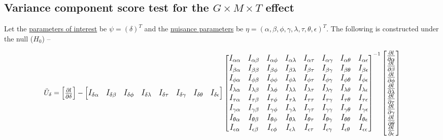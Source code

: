 \documentclass[hidelinks]{article}
\begin{document}
%
\subsection{Variance component score test for the $G \times M \times T$ effect}
%
Let the \underline{parameters of interest} be $\psi = (\delta)^T$ and the \underline{nuisance parameters} be $\eta = (\alpha, \beta, \phi, \gamma, \lambda, \tau, \theta, \epsilon)^T$. The following is constructed under the null ($H_0$) --

\[
\large
\ddot{U}_{\delta} = \begin{bmatrix} \frac{\partial l }{\partial \delta}  \end{bmatrix}
 - \begin{bmatrix} I_{\delta\alpha} & I_{\delta\beta} & I_{\delta\phi}  &   I_{\delta\lambda} &   I_{\delta\tau} & I_{\delta\gamma} & I_{\delta\theta} &I_{\delta\epsilon} \end{bmatrix} 
   \begin{bmatrix} I_{\alpha\alpha} & I_{\alpha\beta} & I_{\alpha\phi} & I_{\alpha\lambda} & I_{\alpha\tau} & I_{\alpha\gamma} & I_{\alpha\theta} & I_{\alpha\epsilon} \\ 
   			 I_{\beta\alpha} & I_{\beta\beta} & I_{\beta\phi} & I_{\beta\lambda} & I_{\beta\tau} &  I_{\beta\gamma} & I_{\beta\theta} & I_{\beta\epsilon} \\ 	
			 I_{\phi\alpha} & I_{\phi\beta} & I_{\phi\phi} & I_{\phi\lambda} & I_{\phi\tau} &  I_{\phi\gamma} & I_{\phi\theta} & I_{\phi\epsilon} \\ 	
			 I_{\lambda\alpha} & I_{\lambda\beta} & I_{\lambda\phi} & I_{\lambda\lambda} & I_{\lambda\tau} &  I_{\lambda\gamma} & I_{\lambda\theta} & I_{\lambda\epsilon} \\ 
			 I_{\tau\alpha} & I_{\tau\beta} & I_{\tau\phi} & I_{\tau\lambda} & I_{\tau\tau} &  I_{\tau\gamma} & I_{\tau\theta} & I_{\tau\epsilon} \\ 	
			 I_{\gamma\alpha} & I_{\gamma\beta} & I_{\gamma\phi} & I_{\gamma\lambda} & I_{\gamma\tau} &  I_{\gamma\gamma} & I_{\gamma\theta} & I_{\gamma\epsilon} \\ 
			 I_{\theta\alpha} & I_{\theta\beta} & I_{\theta\phi} & I_{\theta\lambda} & I_{\theta\tau} &  I_{\theta\gamma} & I_{\theta\theta} & I_{\theta\epsilon} \\ 
			 I_{\epsilon\alpha} & I_{\epsilon\beta} & I_{\epsilon\phi} & I_{\epsilon\lambda} & I_{\epsilon\tau} & I_{\epsilon\gamma} & I_{\epsilon\theta} & I_{\epsilon\epsilon} \end{bmatrix}^{-1} 			 			 
\begin{bmatrix} \frac{\partial l}{\partial \alpha}  \\   \frac{\partial l}{\partial \beta}  \\  \frac{\partial l}{\partial \phi}  \\ \frac{\partial l}{\partial \lambda}  \\ \frac{\partial l}{\partial \tau}  \\    \frac{\partial l}{\partial \gamma}  \\ \frac{\partial l}{\partial \theta}  \\ \frac{\partial l}{\partial \epsilon} \end{bmatrix}
\]
\end{document}

